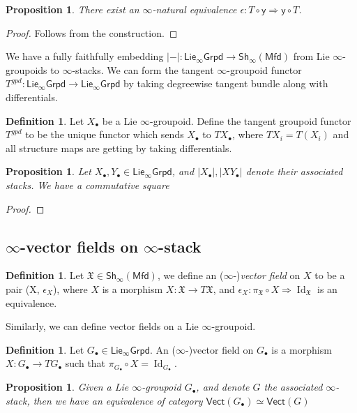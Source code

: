 \documentclass[12pt]{amsart}
\newtheorem{prop}[thm]{Proposition}
\theoremstyle{definition}
\newtheorem{defn}[thm]{Definition}
\theoremstyle{remark}
\numberwithin{equation}{section}
\newcommand{\1}{{\mathbb{1}}}
\newcommand{\y}{\mathsf{y}}
\newcommand{\mfd}{\mathsf{Mfd}}
\newcommand{\ilgpd}{\mathsf{Lie_{\infty}Grpd}}
\newcommand{\shi}{\mathsf{Sh}_{\infty}}
\newcommand{\vect}{\mathsf{Vect}}
\newcommand{\id}{\operatorname{Id}}
\begin{document}
\begin{prop}
	There exist an $\infty$-natural equivalence $\epsilon: T\circ \y 	\Rightarrow \y \circ T$. 
\end{prop}
\begin{proof}Follows from the construction.
	
	\end{proof}
We have a fully faithfully embedding $|-|:\ilgpd \to \shi(\mfd)$ from Lie $\infty$-groupoids to $\infty$-stacks. We can form the tangent $\infty$-groupoid functor $T^{gpd}: \ilgpd \to \ilgpd$ by taking degreewise tangent bundle along with differentials.
\begin{defn}
	Let $X_{\bullet}$ be a Lie $\infty$-groupoid. Define the tangent groupoid functor $T^{gpd}$ to be the unique functor which sends $X_{\bullet}$ to $TX_{\bullet}$, where $TX_{i}= T(X_i)$ and all structure maps are getting by taking differentials.
\end{defn}

\begin{prop}Let $X_{\bullet}, Y_{\bullet} \in \ilgpd$, and $|X_{\bullet}|, |XY_{\bullet}|$ denote their associated stacks.
	We have a commutative square
	
\begin{center}
\end{center}
\end{prop}

\begin{proof}
	\end{proof}
\subsection{$\infty$-vector fields on $\infty$-stack}
\begin{defn}
Let $\mathfrak{X}\in \shi(\mfd)$, we define an ($\infty$-){\it vector field} on $X$ to be a pair (X, $\epsilon_X$), where $X$ is a morphism $X: \mathfrak{X} \to T\mathfrak{X}$, and $\epsilon_X: \pi_{\mathfrak{X}}\circ X\Rightarrow \id_{\mathfrak{X}}$ is an equivalence.
\end{defn}
Similarly, we can define vector fields on a Lie $\infty$-groupoid.

\begin{defn}
	Let $G_{\bullet}\in \ilgpd$. An ($\infty$-)vector field on $G_{\bullet}$ is a morphism $X: G_{\bullet} \to TG_{\bullet}$ such that $\pi_{G_{\bullet}}\circ X = \id_{{G_{\bullet}}}$.
\end{defn}
\begin{prop}
    Given a Lie $\infty$-groupoid $G_{\bullet}$, and denote $G$ the associated $\infty$-stack, then we have an equivalence of category $\vect(G_{\bullet}) \simeq \vect(G)$
\end{prop}
\end{document}
